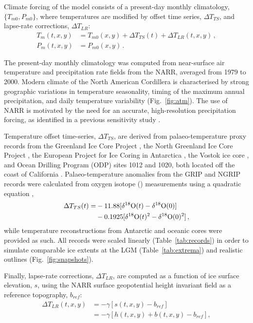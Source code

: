 \documentclass[tc]{copernicus}
\begin{document}
Climate forcing of the model consists of a present-day monthly climatology,
$\{T_{m0}, P_{m0}\}$, where temperatures are modified by offset time series,
${\Delta}T_{TS}$, and lapse-rate corrections, ${\Delta}T_{LR}$:
\begin{align}
    T_m(t, x, y) &= T_{m0}(x, y) + {\Delta}T_{TS}(t)
                    + {\Delta}T_{LR}(t, x, y) \,, \\
    P_m(t, x, y) &= P_{m0}(x, y) \,.
\end{align}

The present-day monthly climatology was computed from
near-surface air temperature and precipitation rate fields from the NARR,
averaged from 1979 to 2000. Modern climate of the
North American Cordillera is characterised by strong geographic variations in
temperature seasonality, timing of the maximum annual precipitation, and
daily temperature variability (Fig.~\ref{fig:atm}).
The use of NARR is motivated by the need for an accurate,
high-resolution precipitation forcing, as identified in a previous sensitivity
study \citep{Seguinot.etal.2014}.

Temperature offset time-series, ${\Delta}T_{TS}$, are derived from
palaeo-temperature proxy records from
the Greenland Ice Core Project \citep[GRIP,][]{Dansgaard.etal.1993}, the
North Greenland Ice Core Project \citep[NGRIP,][]{Andersen.etal.2004},
the European Project for Ice Coring in Antarctica \citep[EPICA,][]
{Jouzel.etal.2007}, the Vostok ice core \citep{Petit.etal.1999}, and Ocean
Drilling Program (ODP) sites 1012 and 1020, both located off the coast of
California \citep{Herbert.etal.2001}. Palaeo-temperature anomalies from the
GRIP and NGRIP
records were calculated from oxygen isotope () measurements
using a quadratic equation \citep{Johnsen.etal.1995},
\begin{align}
    {\Delta}T_{TS}(t) = &-11.88 [\mathrm{\delta^{18}O}(t)
                                -\mathrm{\delta^{18}O}(0)] \nonumber \\
                        &-0.1925[\mathrm{\delta^{18}O}(t)^2
                                 -\mathrm{\delta^{18}O}(0)^2] \,,
\end{align}
while temperature reconstructions from Antarctic and oceanic cores were
provided as such. All records were scaled linearly (Table~\ref{tab:records}) in
order to simulate comparable ice extents at the LGM  (Table~\ref{tab:extrema})
and realistic outlines (Fig.~\ref{fig:snapshots}).

Finally, lapse-rate corrections, ${\Delta}T_{LR}$, are computed as a function
of ice surface elevation, $s$, using the NARR surface geopotential height
invariant field as a reference topography, $b_{ref}$:
\begin{align}
    {\Delta}T_{LR}(t, x, y) &= -\gamma [s(t, x, y)-b_{ref}] \\
                            &= -\gamma [h(t, x, y)+b(t, x, y)-b_{ref}],
\end{align}
\end{document}
